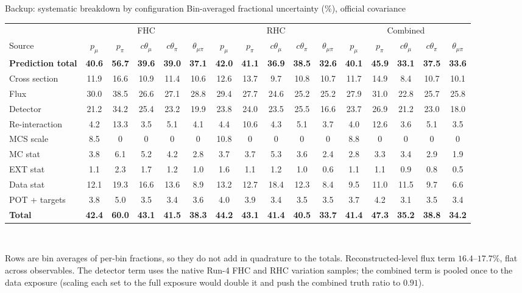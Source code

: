 \documentclass[aspectratio=169,10pt]{beamer}
\begin{document}
\begin{frame}{Backup: systematic breakdown by configuration}
  \scriptsize\centering\setlength{\tabcolsep}{2pt}
  Bin-averaged fractional uncertainty (\%), official covariance\\[1mm]
  \begin{tabular}{l|ccccc|ccccc|ccccc}
    \toprule
    & \multicolumn{5}{c|}{FHC} & \multicolumn{5}{c|}{RHC} & \multicolumn{5}{c}{Combined} \\
    Source & $p_\mu$ & $p_\pi$ & $c\theta_\mu$ & $c\theta_\pi$ & $\theta_{\mu\pi}$ & $p_\mu$ & $p_\pi$ & $c\theta_\mu$ & $c\theta_\pi$ & $\theta_{\mu\pi}$ & $p_\mu$ & $p_\pi$ & $c\theta_\mu$ & $c\theta_\pi$ & $\theta_{\mu\pi}$ \\\midrule
    \textbf{Prediction total} & \textbf{40.6} & \textbf{56.7} & \textbf{39.6} & \textbf{39.0} & \textbf{37.1} & \textbf{42.0} & \textbf{41.1} & \textbf{36.9} & \textbf{38.5} & \textbf{32.6} & \textbf{40.1} & \textbf{45.9} & \textbf{33.1} & \textbf{37.5} & \textbf{33.6} \\
    Cross section & 11.9 & 16.6 & 10.9 & 11.4 & 10.6 & 12.6 & 13.7 & 9.7 & 10.8 & 10.7 & 11.7 & 14.9 & 8.4 & 10.7 & 10.1 \\
    Flux & 30.0 & 38.5 & 26.6 & 27.1 & 28.8 & 29.4 & 27.7 & 24.6 & 25.2 & 25.2 & 27.9 & 31.0 & 22.8 & 25.7 & 25.8 \\
    Detector & 21.2 & 34.2 & 25.4 & 23.2 & 19.9 & 23.8 & 24.0 & 23.5 & 25.5 & 16.6 & 23.7 & 26.9 & 21.2 & 23.0 & 18.0 \\
    Re-interaction & 4.2 & 13.3 & 3.5 & 5.1 & 4.1 & 4.4 & 10.6 & 4.3 & 5.1 & 3.7 & 4.0 & 12.6 & 3.6 & 5.1 & 3.5 \\
    MCS scale & 8.5 & 0 & 0 & 0 & 0 & 10.8 & 0 & 0 & 0 & 0 & 8.8 & 0 & 0 & 0 & 0 \\
    MC stat & 3.8 & 6.1 & 5.2 & 4.2 & 2.8 & 3.7 & 3.7 & 5.3 & 3.6 & 2.4 & 2.8 & 3.3 & 3.4 & 2.9 & 1.9 \\
    EXT stat & 1.1 & 2.3 & 1.7 & 1.2 & 1.0 & 1.6 & 1.1 & 1.2 & 1.0 & 0.6 & 1.1 & 1.1 & 0.9 & 0.8 & 0.5 \\
    Data stat & 12.1 & 19.3 & 16.6 & 13.6 & 8.9 & 13.2 & 12.7 & 18.4 & 12.3 & 8.4 & 9.5 & 11.0 & 11.5 & 9.7 & 6.6 \\
    POT + targets & 3.8 & 5.0 & 3.5 & 3.4 & 3.6 & 4.0 & 3.9 & 3.4 & 3.5 & 3.5 & 3.7 & 4.2 & 3.1 & 3.5 & 3.4 \\\midrule
    \textbf{Total} & \textbf{42.4} & \textbf{60.0} & \textbf{43.1} & \textbf{41.5} & \textbf{38.3} & \textbf{44.2} & \textbf{43.1} & \textbf{41.4} & \textbf{40.5} & \textbf{33.7} & \textbf{41.4} & \textbf{47.3} & \textbf{35.2} & \textbf{38.8} & \textbf{34.2} \\
    \bottomrule
  \end{tabular}\\[2mm]
  \raggedright
  Rows are bin averages of per-bin fractions, so they do not add in quadrature to the totals. Reconstructed-level
  flux term $16.4$--$17.7\%$, flat across observables. The detector term uses the native Run-4 FHC and RHC
  variation samples; the combined term is pooled once to the data exposure (scaling each set to the full exposure
  would double it and push the combined truth ratio to $0.91$).
\end{frame}
\end{document}
